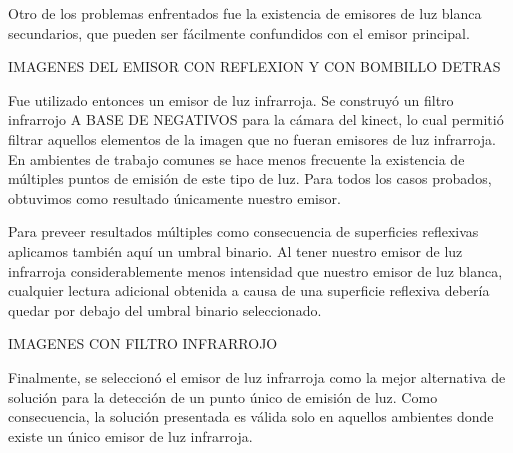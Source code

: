 \documentclass{article}
\begin{document}
Otro de los problemas enfrentados fue la existencia de emisores de luz
blanca secundarios, que pueden ser fácilmente confundidos con el emisor
principal.

IMAGENES DEL EMISOR CON REFLEXION Y CON BOMBILLO DETRAS

Fue utilizado entonces un emisor de luz infrarroja. Se construyó un
filtro infrarrojo A BASE DE NEGATIVOS para la cámara del kinect, lo cual
permitió filtrar aquellos elementos de la imagen que no fueran emisores
de luz infrarroja. En ambientes de trabajo comunes se hace menos
frecuente la existencia de múltiples puntos de emisión de este tipo de
luz. Para todos los casos probados, obtuvimos como resultado únicamente
nuestro emisor.

Para preveer resultados múltiples como consecuencia de superficies
reflexivas aplicamos también aquí un umbral binario. Al tener nuestro
emisor de luz infrarroja considerablemente menos intensidad que nuestro
emisor de luz blanca, cualquier lectura adicional obtenida a causa de
una superficie reflexiva debería quedar por debajo del umbral binario
seleccionado.

IMAGENES CON FILTRO INFRARROJO

Finalmente, se seleccionó el emisor de luz infrarroja como la mejor
alternativa de solución para la detección de un punto único de emisión
de luz. Como consecuencia, la solución presentada es válida solo en
aquellos ambientes donde existe un único emisor de luz infrarroja.
\end{document}
